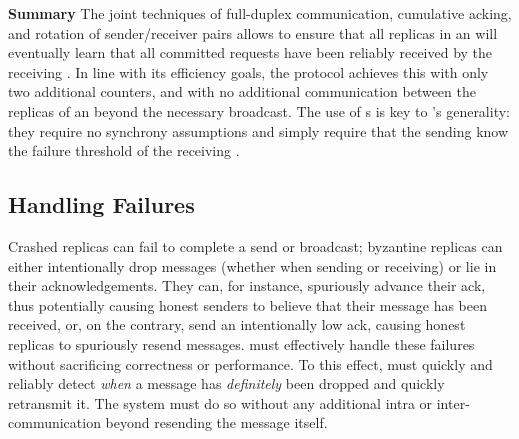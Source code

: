 \par \textbf{Summary} The joint techniques of full-duplex communication, cumulative acking, and rotation of sender/receiver pairs allows \Scrooge{} to ensure that all replicas in an \RSM{} will eventually learn that all committed requests have been reliably received by the receiving \RSM{}. In line with its efficiency goals, the protocol achieves this with only two additional counters, and with no additional communication between the replicas of an \RSM{} beyond the necessary broadcast.  The use of \quack{}s is key to \Scrooge{}'s generality: they require no synchrony assumptions and simply require that the sending \RSM{} know the failure threshold of the receiving \RSM{}. 

\subsection{Handling Failures}
\label{ss:failures}
Crashed replicas can fail to complete a send or broadcast; byzantine replicas can either intentionally drop messages (whether when sending or receiving) or lie in their acknowledgements. They can, for instance, spuriously advance their ack, thus potentially causing honest senders to believe that their message has been received, or, on the contrary, send an intentionally low ack, causing honest replicas to spuriously resend messages.  \Scrooge{} must effectively handle these failures without sacrificing correctness or performance. To this effect,  \Scrooge{} must quickly and reliably detect \textit{when} a message has \textit{definitely} been dropped and quickly retransmit it. The system must do so without any additional intra or inter-\RSM{} communication beyond resending the message itself. 

